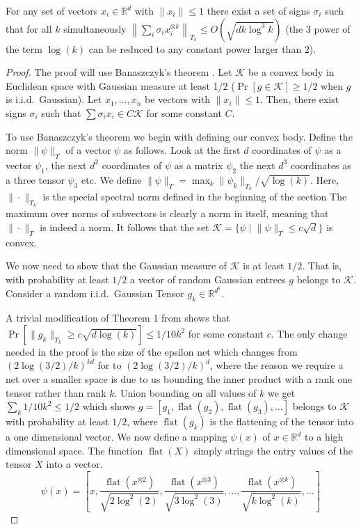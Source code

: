 \documentclass[anon,12pt]{colt2019} %
\newcommand{\R}{\mathbb{R}}
\renewcommand{\Pr}{\operatorname{Pr}}
\begin{document}
\begin{lemma}\label{uc}
For any set of vectors $x_i \in \R^d$ with $\|x_i\| \leq 1$ there exist a set of signs $\sigma_i$ such that for all $k$ simultaneously $\left\| \sum_i \sigma_i x_i^{\otimes k} \right\|_{T_k} \le O(\sqrt{d k\log^{3}{k}})$ (the $3$ power of the term $\log(k)$ can be reduced to any constant power larger than $2$). 
\end{lemma}
\begin{proof}
The proof will use Banaszczyk's theorem \cite{Banaszczyk}. 
Let $\mathcal K$ be a convex body in Euclidean space with Gaussian measure at least 1/2 ($\Pr[g \in \mathcal K] \ge 1/2$ when $g$ is i.i.d.\ Gaussian).
Let $x_1,\ldots,x_n$ be vectors with $\|x_i\| \leq 1$. 
Then, there exist signs $\sigma_i$ such that $\sum \sigma_i x_i \in C \mathcal K$ for some constant $C$.

To use Banaszczyk's theorem we begin with defining our convex body.
Define the norm $\|\psi\|_T$ of a vector $\psi$ as follows. Look at the first $d$ coordinates of $\psi$ as a vector $\psi_1$, the next $d^2$ coordinates of $\psi$ as a matrix $\psi_2$ the next $d^3$ coordinates as a three tensor $\psi_3$ etc.
We define $\|\psi\|_T = \max_k \|\psi_k\|_{T_k} /\sqrt{\log(k)}$. 
Here, $\|\cdot\|_{T_k}$ is the special spectral norm defined in the beginning of the section 
The maximum over norms of subvectors is clearly a norm in itself, meaning that $\|\cdot \|_T$ is indeed a norm. It follows that  the set $\mathcal K  = \{\psi \; | \; \|\psi\|_T \le c\sqrt{d}\}$ is convex. 

We now need to show that the Gaussian measure of $\mathcal K$ is at least $1/2$. 
That is, with probability at least $1/2$ a vector of random Gaussian entrees $g$ belongs to $\mathcal K$.
Consider a random i.i.d.\ Gaussian Tensor $g_k \in \R^{d^k}$. 

A trivial modification of Theorem 1 from \cite{tomioka2014spectral} shows that $\Pr[\|g_k\|_{T_k} \ge c\sqrt{d\log(k)}] \le 1/10k^2$ for some constant $c$. The only change needed in the proof is the size of the epsilon net which changes from $(2\log(3/2)/k)^{kd}$ for \cite{tomioka2014spectral} to $(2\log(3/2)/k)^d$, where the reason we require a net over a smaller space is due to us bounding the inner product with a rank one tensor rather than rank $k$. Union bounding on all values of $k$ we get $\sum_k 1/10k^2 \le 1/2$ which shows $g = [g_1, \operatorname{flat}(g_2), \operatorname{flat}(g_3), \ldots]$ belongs to $\mathcal K$ with probability at least $1/2$, where $\operatorname{flat}(g_k)$ is the flattening of the tensor into a one dimensional vector. 
%
We now define a mapping $\psi(x)$ of $x\in \R^d$ to a high dimensional space. The function $\operatorname{flat}(X)$ simply strings the entry values of the tensor $X$ into a vector.
$$\psi(x) = \left[x, \frac{\operatorname{flat}(x^{\otimes 2})}{\sqrt{2\log^2(2)}}, \frac{\operatorname{flat}(x^{\otimes 3})}{\sqrt{3\log^2(3)}}, \ldots,\frac{\operatorname{flat}(x^{\otimes k})}{\sqrt{k\log^2(k)}},\ldots \right]$$


\end{proof}
\end{document}
